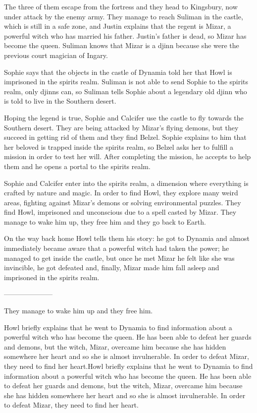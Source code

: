 The three of them escape from the fortress and they head to Kingsbury, now under attack by the enemy army. They manage to reach Suliman in the castle, which is still in a safe zone, and Justin explains that the regent is Mizar, a powerful witch who has married his father. Justin's father is dead, so Mizar has become the queen. Suliman knows that Mizar is a djinn because she were the previous court magician of Ingary.

Sophie says that the objects in the castle of Dynamia told her that Howl is imprisoned in the spirits realm. Suliman is not able to send Sophie to the spirits realm, only djinns can, so Suliman tells Sophie about a legendary old djinn who is told to live in the Southern desert.

Hoping the legend is true, Sophie and Calcifer use the castle to fly towards the Southern desert. They are being attacked by Mizar's flying demons, but they succeed in getting rid of them and they find Belzel. Sophie explains to him that her beloved is trapped inside the spirits realm, so Belzel asks her to fulfill a mission in order to test her will. After completing the mission, he accepts to help them and he opens a portal to the spirits realm.

Sophie and Calcifer enter into the spirits realm, a dimension where everything is crafted by nature and magic. In order to find Howl, they explore many weird areas, fighting against Mizar's demons or solving environmental puzzles. They find Howl, imprisoned and unconscious due to a spell casted by Mizar. They manage to wake him up, they free him and they go back to Earth.

On the way back home Howl tells them his story: he got to Dynamia and almost immediately became aware that a powerful witch had taken the power; he managed to get inside the castle, but once he met Mizar he felt like she was invincible, he got defeated and, finally, Mizar made him fall asleep and imprisoned in the spirits realm.

---------------------

They manage to wake him up and they free him.

Howl briefly explains that he went to Dynamia to find information about a powerful witch who has become the queen. He has been able to defeat her guards and demons, but the witch, Mizar, overcame him because she has hidden somewhere her heart and so she is almost invulnerable. In order to defeat Mizar, they need to find her heart.Howl briefly explains that he went to Dynamia to find information about a powerful witch who has become the queen. He has been able to defeat her guards and demons, but the witch, Mizar, overcame him because she has hidden somewhere her heart and so she is almost invulnerable. In order to defeat Mizar, they need to find her heart.

